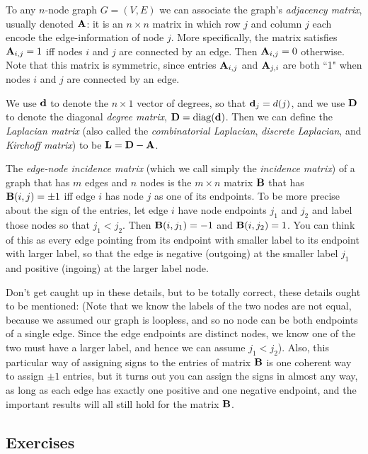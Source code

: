To any $n$-node graph $G = (V,E)$ we can associate the graph's \emph{adjacency matrix}, usually denoted $\textbf{A}$: it is an $n \times n$ matrix in which row $j$ and column $j$ each encode the edge-information of node $j$. More specifically, the matrix satisfies $\textbf{A}_{i,j} = 1$ iff nodes $i$ and $j$ are connected by an edge. Then $\textbf{A}_{i,j} = 0$ otherwise. Note that this matrix is symmetric, since entries $\textbf{A}_{i,j}$ and $\textbf{A}_{j,i}$ are both ``1" when nodes $i$ and $j$ are connected by an edge.

We use $\textbf{d}$ to denote the $n\times 1$ vector of degrees, so that $\textbf{d}_j = d(j)$, and we use $\textbf{D}$ to denote the diagonal \emph{degree matrix}, $\textbf{D} = \operatorname{diag}(\textbf{d})$. Then we can define the \emph{Laplacian matrix} (also called the \emph{combinatorial Laplacian}, \emph{discrete Laplacian}, and \emph{Kirchoff matrix}) to be $\textbf{L} = \textbf{D} - \textbf{A}$.

The \emph{edge-node incidence matrix} (which we call simply the \emph{incidence matrix}) of a graph that has $m$ edges and $n$ nodes is the $m \times n$ matrix $\textbf{B}$ that has $\textbf{B}(i,j) = \pm1$ iff edge $i$ has node $j$ as one of its endpoints. To be more precise about the sign of the entries, let edge $i$ have node endpoints $j_{1}$ and $j_{2}$ and label those nodes so that $j_1 < j_2$. Then $\textbf{B}(i,j_1) = -1$ and $\textbf{B}(i,j_2) = 1$. You can think of this as every edge pointing from its endpoint with smaller label to its endpoint with larger label, so that the edge is negative (outgoing) at the smaller label $j_1$ and positive (ingoing) at the larger label node.

Don't get caught up in these details, but to be totally correct, these details ought to be mentioned:
(Note that we know the labels of the two nodes are not equal, because we assumed our graph is loopless, and so no node can be both endpoints of a single edge. Since the edge endpoints are distinct nodes, we know one of the two must have a larger label, and hence we can assume $j_1 < j_2$). Also, this particular way of assigning signs to the entries of matrix $\textbf{B}$ is one coherent way to assign $\pm1$ entries, but it turns out you can assign the signs in almost any way, as long as each edge has exactly one positive and one negative endpoint, and the important results will all still hold for the matrix $\textbf{B}$.

\subsection{Exercises}

